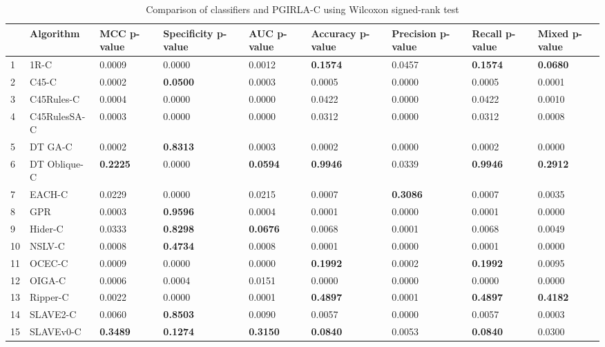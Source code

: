 \begin{table}
\footnotesize
\caption{Comparison of classifiers and PGIRLA-C using Wilcoxon signed-rank test}
\label{tab:wilcoxon comparison}
\begin{tabular}{lllllllll}
\hline
 & Algorithm & MCC p-value & Specificity p-value & AUC p-value & Accuracy p-value & Precision p-value & Recall p-value & Mixed p-value \\
\hline
1 & 1R-C & 0.0009 & 0.0000 & 0.0012 & \textbf{0.1574} & 0.0457 & \textbf{0.1574} & \textbf{0.0680} \\
2 & C45-C & 0.0002 & \textbf{0.0500} & 0.0003 & 0.0005 & 0.0000 & 0.0005 & 0.0001 \\
3 & C45Rules-C & 0.0004 & 0.0000 & 0.0000 & 0.0422 & 0.0000 & 0.0422 & 0.0010 \\
4 & C45RulesSA-C & 0.0003 & 0.0000 & 0.0000 & 0.0312 & 0.0000 & 0.0312 & 0.0008 \\
5 & DT GA-C & 0.0002 & \textbf{0.8313} & 0.0003 & 0.0002 & 0.0000 & 0.0002 & 0.0000 \\
6 & DT Oblique-C & \textbf{0.2225} & 0.0000 & \textbf{0.0594} & \textbf{0.9946} & 0.0339 & \textbf{0.9946} & \textbf{0.2912} \\
7 & EACH-C & 0.0229 & 0.0000 & 0.0215 & 0.0007 & \textbf{0.3086} & 0.0007 & 0.0035 \\
8 & GPR & 0.0003 & \textbf{0.9596} & 0.0004 & 0.0001 & 0.0000 & 0.0001 & 0.0000 \\
9 & Hider-C & 0.0333 & \textbf{0.8298} & \textbf{0.0676} & 0.0068 & 0.0001 & 0.0068 & 0.0049 \\
10 & NSLV-C & 0.0008 & \textbf{0.4734} & 0.0008 & 0.0001 & 0.0000 & 0.0001 & 0.0000 \\
11 & OCEC-C & 0.0009 & 0.0000 & 0.0000 & \textbf{0.1992} & 0.0002 & \textbf{0.1992} & 0.0095 \\
12 & OIGA-C & 0.0006 & 0.0004 & 0.0151 & 0.0000 & 0.0000 & 0.0000 & 0.0000 \\
13 & Ripper-C & 0.0022 & 0.0000 & 0.0001 & \textbf{0.4897} & 0.0001 & \textbf{0.4897} & \textbf{0.4182} \\
14 & SLAVE2-C & 0.0060 & \textbf{0.8503} & 0.0090 & 0.0057 & 0.0000 & 0.0057 & 0.0003 \\
15 & SLAVEv0-C & \textbf{0.3489} & \textbf{0.1274} & \textbf{0.3150} & \textbf{0.0840} & 0.0053 & \textbf{0.0840} & 0.0300 \\
\hline
\end{tabular}
\end{table}
